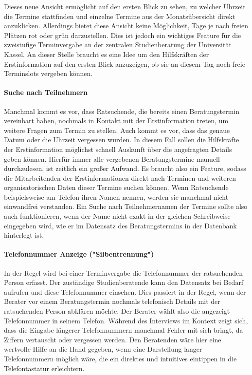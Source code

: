\documentclass[12pt]{article}
\begin{document}
Dieses neue Ansicht ermöglicht auf den ersten Blick zu sehen, zu welcher
Uhrzeit die Termine stattfinden und einzelne Termine aus der Monatsübersicht
direkt anzuklicken. Allerdings bietet diese Ansicht keine Möglichkeit, Tage je
nach freien Plätzen rot oder grün darzustellen. Dies ist jedoch ein wichtiges
Feature für die zweistufige Terminvergabe an der zentralen Studienberatung der
Universität Kassel. An dieser Stelle braucht es eine Idee um den Hilfskräften
der Erstinformation auf den ersten Blick anzuzeigen, ob sie an diesem Tag noch
freie Terminslots vergeben können.

\paragraph{Suche nach Teilnehmern}
Manchmal kommt es vor, dass Ratsuchende, die bereits einen Beratungstermin
vereinbart haben, nochmals in Kontakt mit der Erstinformation treten, um
weitere Fragen zum Termin zu stellen. Auch kommt es vor, dass das genaue Datum
oder die Uhrzeit vergessen wurden. In diesem Fall sollen die Hilfskräfte der
Erstinformation möglichst schnell Auskunft über die angefragten Details geben
können. Hierfür immer alle vergebenen Beratungstermine manuell durchzulesen,
ist zeitlich ein großer Aufwand. Es braucht also ein Feature, sodass die
Mitarbeitenden der Erstinformationen direkt nach Terminen und weiteren
organisatorischen Daten dieser Termine suchen können. Wenn Ratsuchende
beispielsweise am Telefon ihren Namen nennen, werden sie manchmal nicht
einwandfrei verstanden. Ein Suche nach Teilnehmernamen der Termine sollte also
auch funktionieren, wenn der Name nicht exakt in der gleichen Schreibweise
eingegeben wird, wie er im Datensatz des Beratungstermins in der Datenbank
hinterlegt ist.

\paragraph{Telefonnummer Anzeige ("Silbentrennung")}
In der Regel wird bei einer Terminvergabe die Telefonnummer der ratsuchenden
Person erfasst. Der zuständige Studienberatende kann den Datensatz bei Bedarf
aufrufen und diese Telefonnummer einsehen. Dies passiert in der Regel, wenn der
Berater vor einem Beratungstermin nochmals telefonisch Details mit der
ratsuchenden Person abklären möchte. Der Berater wählt also die angezeigt
Telefonnummer in seinem Telefon. Während des Interviews im Kontext zeigt sich,
dass die Eingabe längerer Telefonnummern manchmal Fehler mit sich bringt, da
Ziffern vertauscht oder vergessen werden. Den Beratenden wäre hier eine
wertvolle Hilfe an die Hand gegeben, wenn eine Darstellung langer
Telefonnummern möglich wäre, die ein direktes und intuitives eintippen in die
Telefontastatur erleichtern. 
\end{document}
